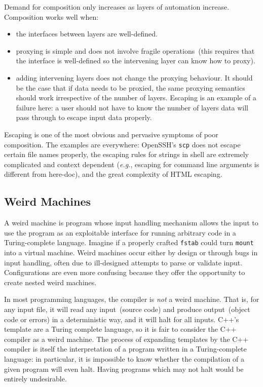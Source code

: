 \documentclass[letterpaper,twocolumn,10pt]{article}
\begin{document}

Demand for composition only increases as layers of automation increase. Composition works well when:

\begin{itemize}
\item the interfaces between layers are well-defined.
\item proxying is simple and does not involve fragile operations~(this requires that the interface is well-defined so the intervening layer can know how to proxy).
\item adding intervening layers does not change the proxying behaviour. It should be the case that if data needs to be proxied, the same proxying semantics should work irrespective of the number of layers. Escaping is an example of a failure here: a user should not have to know the number of layers data will pass through to escape input data properly.
\end{itemize}

Escaping is one of the most obvious and pervasive symptoms of poor composition. The examples are everywhere: OpenSSH's \texttt{scp} does not escape certain file names properly, the escaping rules for strings in shell are extremely complicated and context dependent (\emph{e.g.}, escaping for command line arguments is different from here-doc), and the great complexity of HTML escaping.

\subsection{Weird Machines}
A weird machine is program whose input handling mechanism allows the input to use the program as an exploitable interface for running arbitrary code in a Turing-complete language. Imagine if a properly crafted \texttt{fstab} could turn \texttt{mount} into a virtual machine. Weird machines occur either by design or through bugs in input handling, often due to ill-designed attempts to parse or validate input\cite{weird}. Configurations are even more confusing because they offer the opportunity to create nested weird machines.

In most programming languages, the compiler is \emph{not} a weird machine. That is, for any input file, it will read any input~(source code) and produce output~(object code or errors) in a deterministic way, and it will halt for all inputs. C++'s template are a Turing complete language, so it is fair to consider the C++ compiler as a weird machine. The process of expanding templates by the C++ compiler is itself the interpretation of a program written in a Turing-complete language: in particular, it is impossible to know whether the compilation of a given program will even halt. Having programs which may not halt would be entirely undesirable.
\end{document}
